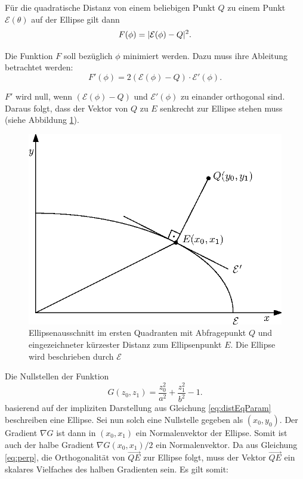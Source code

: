 Für die quadratische Distanz von einem beliebigen Punkt $Q$ zu einem Punkt $\mathcal{E}(\theta)$ auf der Ellipse gilt dann
\begin{equation}
	F(\phi) = \lvert\mathcal{E}(\phi) - Q\rvert^2.
\end{equation}

Die Funktion $F$ soll bezüglich $\phi$ minimiert werden. Dazu muss ihre Ableitung betrachtet werden:
\begin{equation}\label{eq:perp}
F'(\phi) = 2\left(\mathcal{E}(\phi) - Q\right) \cdot \mathcal{E}'(\phi).
\end{equation}

$F'$ wird null, wenn $\left(\mathcal{E}(\phi) - Q\right)$ und $ \mathcal{E}'(\phi)$ zu einander orthogonal sind. Daraus folgt, dass der Vektor von $Q$ zu $E$ senkrecht zur Ellipse stehen muss (siehe Abbildung \ref{fig:ellipseDist}).


\begin{figure}[!htb]
	\centering
	\includegraphics[scale=.9]{images/ellipseQuery.eps}
	\caption{Ellipsenausschnitt im ersten Quadranten mit Abfragepunkt $Q$ und eingezeichneter kürzester Distanz zum Ellipsenpunkt $E$. Die Ellipse wird beschrieben durch $\mathcal{E}$}
	\label{fig:ellipseDist}
\end{figure}

Die Nullstellen der Funktion
\begin{equation} \label{eq:ellipseDistEq}
	G(z_0,z_1) = \frac{z_0^2}{a^2} + \frac{z_1^2}{b^2} - 1.
\end{equation}
basierend auf der impliziten Darstellung aus Gleichung \ref{eq:distEqParam}
beschreiben eine Ellipse. Sei nun solch eine Nullstelle gegeben als $(x_0,y_0)$. Der Gradient $\nabla G$ ist dann in $(x_0,x_1)$ ein Normalenvektor der Ellipse. Somit ist auch der halbe Gradient $\nabla G(x_0,x_1)/2$ ein Normalenvektor. Da aus Gleichung \ref{eq:perp}, die Orthogonalität von $\overrightarrow{QE}$ zur Ellipse folgt,  muss der Vektor  $\overrightarrow{QE}$ ein skalares Vielfaches des halben Gradienten sein. Es gilt somit:

